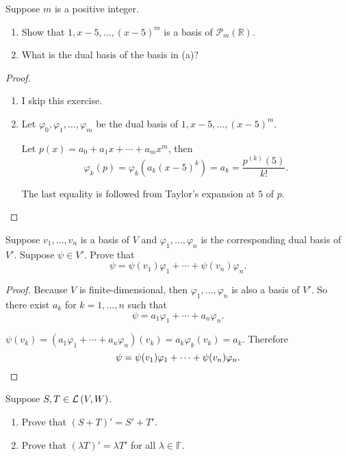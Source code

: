 \begin{exercise}
    Suppose $m$ is a positive integer.
    \begin{enumerate}[label={(\alph*)}]
        \item Show that $1, x - 5, \ldots, {(x-5)}^{m}$ is a basis of $\mathcal{P}_{m}(\mathbb{R})$.
        \item What is the dual basis of the basis in (a)?
    \end{enumerate}
\end{exercise}

\begin{proof}
    \begin{enumerate}[label={(\alph*)}]
        \item I skip this exercise.
        \item Let $\varphi_{0}, \varphi_{1}, \ldots, \varphi_{m}$ be the dual basis of $1, x - 5, \ldots, {(x - 5)}^{m}$.

              Let $p(x) = a_{0} + a_{1}x + \cdots + a_{m}x^{m}$, then
              \[
                  \varphi_{k}(p) = \varphi_{k}(a_{k}{(x - 5)}^{k}) = a_{k} = \frac{p^{(k)}(5)}{k!}.
              \]

              The last equality is followed from Taylor's expansion at $5$ of $p$.
    \end{enumerate}
\end{proof}
\newpage

\begin{exercise}
    Suppose $v_{1} , \ldots, v_{n}$ is a basis of $V$ and $\varphi_{1} , \ldots, \varphi_{n}$ is the corresponding dual basis of $V'$. Suppose $\psi \in V'$. Prove that
    \[
        \psi = \psi(v_{1})\varphi_{1} + \cdots + \psi(v_{n})\varphi_{n}.
    \]
\end{exercise}

\begin{proof}
    Because $V$ is finite-dimensional, then $\varphi_{1} , \ldots, \varphi_{n}$ is also a basis of $V'$. So there exist $a_{k}$ for $k = 1, \ldots, n$ such that
    \[
        \psi = a_{1}\varphi_{1} + \cdots + a_{n}\varphi_{n}.
    \]

    $\psi(v_{k}) = (a_{1}\varphi_{1} + \cdots + a_{n}\varphi_{n})(v_{k}) = a_{k}\varphi_{k}(v_{k}) = a_{k}$. Therefore
    \[
        \psi = \psi(v_{1})\varphi_{1} + \cdots + \psi(v_{n})\varphi_{n}.\qedhere
    \]
\end{proof}
\newpage

\begin{exercise}
    Suppose $S, T\in \mathcal{L}\left({V, W}\right)$.
    \begin{enumerate}[label={(\alph*)}]
        \item Prove that ${(S + T)}' = S' + T'$.
        \item Prove that ${(\lambda T)}' = \lambda T'$ for all $\lambda\in \mathbb{F}$.
    \end{enumerate}
\end{exercise}

